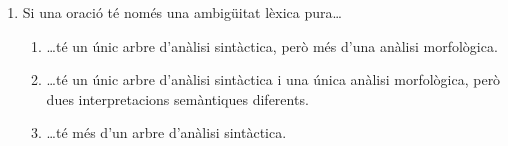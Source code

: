 \begin{enumerate}
    
      

\item Si una oració té només una ambigüitat lèxica pura\ldots
  \begin{enumerate}
  \item \ldots té un únic arbre d'anàlisi sintàctica, però més d'una
    anàlisi morfològica.
  \item \ldots té un únic arbre d'anàlisi sintàctica i una única
    anàlisi morfològica, però dues interpretacions se\-màn\-ti\-ques
    diferents.
  \item \ldots té més d'un arbre d'anàlisi sintàctica.
  \end{enumerate}


\end{enumerate}
